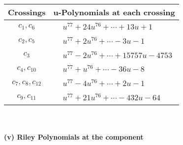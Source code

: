 \documentclass[1p]{elsarticle_modified}
\theoremstyle{definition}
\begin{document}
\begin{tabular}{m{50pt}|m{274pt}}
Crossings & \hspace{64pt}u-Polynomials at each crossing \\
\hline $$\begin{aligned}c_{1},c_{6}\end{aligned}$$&$\begin{aligned}
&u^{77}+24 u^{76}+\cdots+13 u+1
\end{aligned}$\\
\hline $$\begin{aligned}c_{2},c_{5}\end{aligned}$$&$\begin{aligned}
&u^{77}+2 u^{76}+\cdots-3 u-1
\end{aligned}$\\
\hline $$\begin{aligned}c_{3}\end{aligned}$$&$\begin{aligned}
&u^{77}-2 u^{76}+\cdots+15757 u-4753
\end{aligned}$\\
\hline $$\begin{aligned}c_{4},c_{10}\end{aligned}$$&$\begin{aligned}
&u^{77}+u^{76}+\cdots-36 u-8
\end{aligned}$\\
\hline $$\begin{aligned}c_{7},c_{8},c_{12}\end{aligned}$$&$\begin{aligned}
&u^{77}-4 u^{76}+\cdots+2 u-1
\end{aligned}$\\
\hline $$\begin{aligned}c_{9},c_{11}\end{aligned}$$&$\begin{aligned}
&u^{77}+21 u^{76}+\cdots-432 u-64
\end{aligned}$\\
\hline
\end{tabular}\\~\\
\newpage\renewcommand{\arraystretch}{1}
\flushleft \textbf{(v) Riley Polynomials at the component}\newline \\
\end{document}
